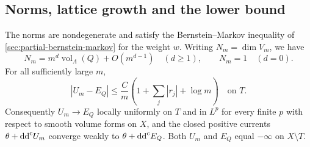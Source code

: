 \subsection{Norms, lattice growth and the lower bound}

\begin{theorem}\label{thm:newton-potential-lower-bound}
The norms are nondegenerate and satisfy the Bernstein--Markov inequality of \cref{sec:partial-bernstein-markov} for the weight $w$.
Writing $N_m=\dim V_m$, we have
\[
 N_m=m^d\operatorname{vol}_\Lambda(Q)+O(m^{d-1})\quad(d\geq1),
 \qquad N_m=1\quad(d=0).
\]
For all sufficiently large $m$,
\begin{equation}\label{eq:newton-potential-error}
 |U_m-E_Q|\leq\frac{C}{m}
       \left(1+\sum_j|r_j|+\log m\right)\quad\text{on }T.
\end{equation}
Consequently $U_m\to E_Q$ locally uniformly on $T$ and in $L^p$ for every finite $p$ with respect to smooth volume forms on $X$, and the closed positive currents $\theta+\mathrm{dd}^{\mathrm{c}} U_m$ converge weakly to $\theta+\mathrm{dd}^{\mathrm{c}} E_Q$. Both $U_m$ and $E_Q$ equal $-\infty$ on $X\setminus T$.
\end{theorem}
